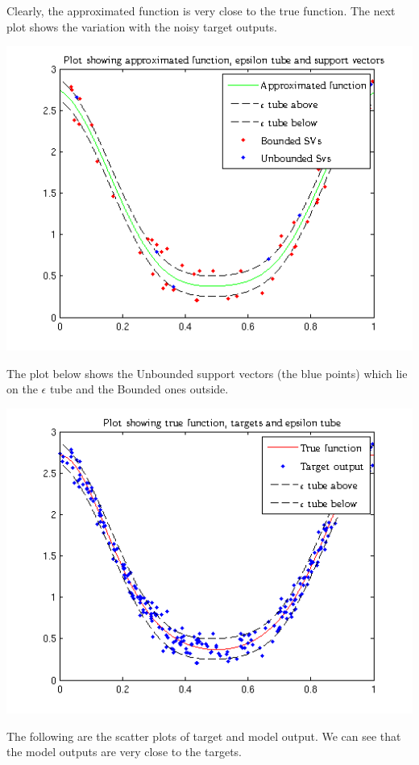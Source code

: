 \documentclass{article}
\begin{document}
Clearly, the approximated function is very close to the true function. The next plot shows the variation with the noisy target outputs.
\begin{center}
\includegraphics[scale=0.7]{Regression/plot_2}
\end{center}
The plot below shows the Unbounded support vectors (the blue points) which lie on the $\epsilon$ tube and the Bounded ones outside.
\begin{center}
\includegraphics[scale=1]{Regression/plot_3}
\end{center}
The following are the scatter plots of target and model output. We can see that the model outputs are very close to the targets. 
\end{document}
